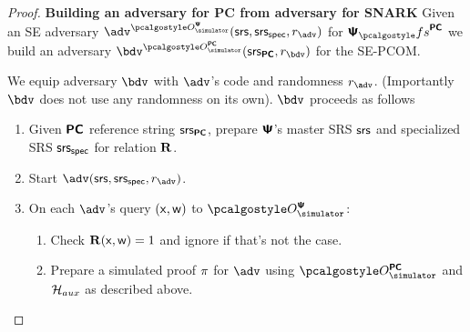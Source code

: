 \documentclass[runningheads,11pt]{llncs}
\begin{document}
\begin{proof}
\noindent
\textbf{Building an adversary for PC from adversary for SNARK}
Given an SE adversary $\adv^{\oraclesps}(\srs, \srss, \radv)$ for $\PS_\fs^{\PCOM}$
we build an adversary $\bdv^{\oraclespcom}(\srs_{\PCOM}, \rbdv)$ for the SE-PCOM.

We equip adversary $\bdv$ with $\adv$'s code and randomness
  $\radv$. (Importantly $\bdv$ does not use any randomness on its
  own). $\bdv$ proceeds as follows
  \begin{enumerate}
  \item Given $\bm{\mathsf{PC}}$ reference string $\mathsf{srs}_{\bm{\mathsf{PC}}}$, prepare $\bm{\mathsf{\Psi}}$'s master
    SRS $\mathsf{srs}$ and specialized SRS $\mathsf{srs_{spec}}$ for relation $\mathbf{R}$.
  \item Start $\adv(\srs, \srss, \radv)$.
    \item On each $\adv$'s query $(\mathsf{x}, \mathsf{w})$ to $\oraclesps$:
    \begin{enumerate}
    \item Check $\mathbf{R}(\mathsf{x}, \mathsf{w}) = 1$ and ignore if that's not the case.
      \item Prepare a simulated proof $\pi$ for $\adv$ using $\oraclespcom$ and $\mathcal{H}_{aux}$ as described above.


\end{enumerate}
\end{enumerate}
\end{proof}
\end{document}
